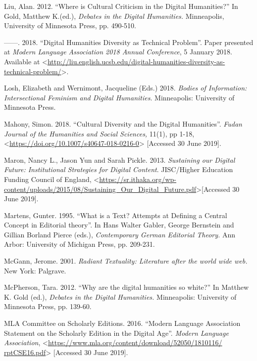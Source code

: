 \begin{paper}
\begin{flushleft}
Liu, Alan. 2012. ``Where is Cultural Criticism in the Digital
Humanities?'' In Gold, Matthew K.(ed.), \emph{Debates in the Digital
Humanities.} Minneapolis, University of Minnesota Press, pp. 490-510.

------. 2018. ``Digital Humanities Diversity as Technical Problem''. Paper
presented at \emph{Modern Language Association 2018 Annual Conference},
5 January 2018. Available at
\textless{}\href{http://liu.english.ucsb.edu/digital-humanities-diversity-as-technical-problem/}{http://liu.english.ucsb.edu/digital-humanities-diversity-as-technical-problem/}\textgreater{}.

Losh, Elizabeth and Wernimont, Jacqueline (Eds.) 2018. \emph{Bodies of Information: Intersectional Feminism and Digital Humanities}. Minneapolis: University of Minnesota Press. 

Mahony, Simon. 2018. ``Cultural Diversity and the Digital Humanities''.
\emph{Fudan Journal of the Humanities and Social Sciences,} 11(1), pp
1-18, \textless{}\href{https://doi.org/10.1007/s40647-018-0216-0}{https://doi.org/10.1007/s40647-018-0216-0}\textgreater{}
{[}Accessed 30 June 2019{]}.

Maron, Nancy L., Jason Yun and Sarah Pickle. 2013. \emph{Sustaining our
Digital Future: Institutional Strategies for Digital Content}.
JISC/Higher Education Funding Council of England, \textless{}\href{https://sr.ithaka.org/wp-content/uploads/2015/08/Sustaining\_Our\_Digital\_Future.pdf}{https://sr.ithaka.org/wp-content/uploads/2015/08/Sustaining\_Our\_Digital\_Future.pdf}\textgreater{}{[}Accessed 30 June 2019{]}.

Martens, Gunter. 1995. ``What is a Text? Attempts at Defining a Central
Concept in Editorial theory''. In Hans Walter Gabler, George Bernstein
and Gillian Borland Pierce (eds.), \emph{Contemporary German Editorial
Theory.} Ann Arbor: University of Michigan Press, pp. 209-231.

McGann, Jerome. 2001. \emph{Radiant Textuality: Literature after the
world wide web.} New York: Palgrave.

McPherson, Tara. 2012. ``Why are the digital humanities so white?'' In
Matthew K. Gold (ed.), \emph{Debates in the Digital Humanities.}
Minneapolis: University of Minnesota Press, pp. 139-60.

MLA Committee on Scholarly Editions. 2016. ``Modern Language Association
Statement on the Scholarly Edition in the Digital Age''. \emph{Modern
Language Association},
\textless{}\href{https://www.mla.org/content/download/52050/1810116/rptCSE16.pdf}{https://www.mla.org/content/download/52050/1810116/ rptCSE16.pdf}\textgreater{}
{[}Accessed 30 June 2019{]}.


\end{flushleft}
\end{paper}
